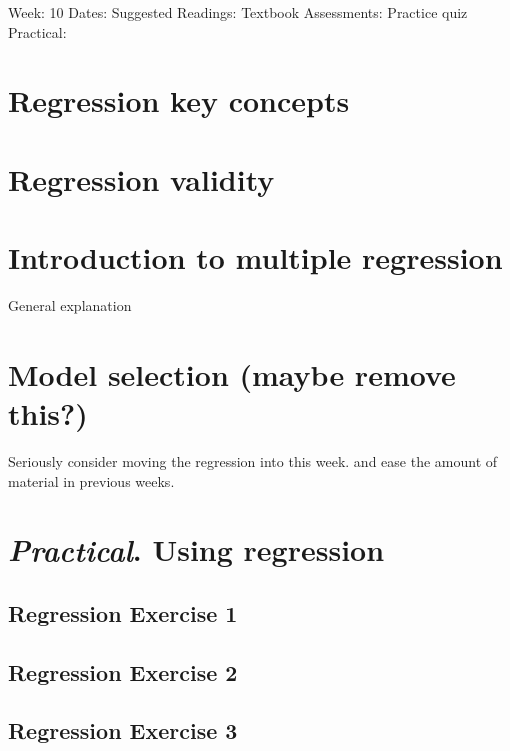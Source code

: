 \documentclass[
]{scrbook}
\begin{document}
Week: 10
Dates:
Suggested Readings: Textbook
Assessments: Practice quiz
Practical:

\hypertarget{regression-key-concepts}{%
\chapter{Regression key concepts}\label{regression-key-concepts}}

\hypertarget{regression-validity}{%
\chapter{Regression validity}\label{regression-validity}}

\hypertarget{introduction-to-multiple-regression}{%
\chapter{Introduction to multiple regression}\label{introduction-to-multiple-regression}}

General explanation

\hypertarget{model-selection-maybe-remove-this}{%
\chapter{Model selection (maybe remove this?)}\label{model-selection-maybe-remove-this}}

Seriously consider moving the regression into this week. and ease the amount of material in previous weeks.

\hypertarget{practical.-using-regression}{%
\chapter{\texorpdfstring{\emph{Practical}. Using regression}{Practical. Using regression}}\label{practical.-using-regression}}

\hypertarget{regression-exercise-1}{%
\section{Regression Exercise 1}\label{regression-exercise-1}}

\hypertarget{regression-exercise-2}{%
\section{Regression Exercise 2}\label{regression-exercise-2}}

\hypertarget{regression-exercise-3}{%
\section{Regression Exercise 3}\label{regression-exercise-3}}
\end{document}
